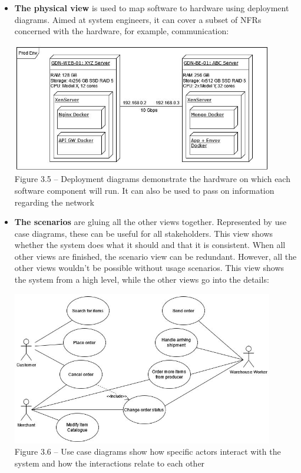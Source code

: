 \begin{itemize}
\item
\textbf{The physical view} is used to map software to hardware using deployment diagrams. Aimed at system engineers, it can cover a subset of NFRs concerned with the hardware, for example, communication:

\begin{center}
\includegraphics[width=0.9\textwidth]{content/1/chapter3/images/5.jpg}\\
Figure 3.5 – Deployment diagrams demonstrate the hardware on which each software component will run. It can also be used to pass on information regarding the network
\end{center}

\item
\textbf{The scenarios} are gluing all the other views together. Represented by use case diagrams, these can be useful for all stakeholders. This view shows whether the system does what it should and that it is consistent. When all other views are finished, the scenario view can be redundant. However, all the other views wouldn't be possible without usage scenarios. This view shows the system from a high level, while the other views go into the details:


\begin{center}
\includegraphics[width=0.9\textwidth]{content/1/chapter3/images/6.jpg}\\
Figure 3.6 – Use case diagrams show how specific actors interact with the system and how the interactions relate to each other
\end{center}

\end{itemize}

